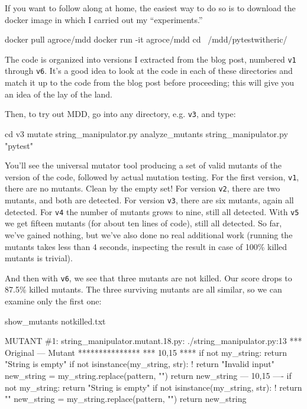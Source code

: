 \documentclass[sigplan,screen]{acmart}
\begin{document}
    If you want to follow along at home, the easiest way to do so is
    to download the docker image in which I carried out my
    ``experiments.''

 \begin{code}
 docker pull agroce/mdd
 docker run -it agroce/mdd
 cd ~/mdd/pytestwitheric/
 \end{code}

The code is organized into versions I extracted from the blog
post, numbered {\tt v1} through {\tt v6}.  It's a good idea to look at
the code in each of these directories and match it up to the code from
the blog post before proceeding; this will give you an idea of the
lay of the land.
 
    Then, to try out MDD, go into any directory, e.g. {\tt v3}, and type:

 \begin{code}
 cd v3
 mutate string\_manipulator.py
 analyze\_mutants string\_manipulator.py "pytest"
\end{code}

You'll see the universal mutator tool producing a set of valid mutants
of the version of the code, followed by actual mutation testing.  For
the first version, {\tt v1}, there are no mutants.  Clean by the
empty set!  For version {\tt v2}, there are two mutants, and both are
detected.  For version {\tt v3}, there are six mutants, again all
detected. For {\tt v4} the number of mutants grows to nine, still all
detected.  With {\tt v5} we get fifteen mutants (for about ten lines
of code), still all detected.  So far, we've gained nothing, but we've
also done no real additional work (running the mutants takes less than 4
seconds, inspecting the result in case of 100\% killed mutants is trivial).

And then with {\tt v6}, we see that three mutants are not killed. Our
score drops to 87.5\% killed mutants.  The three surviving mutants are
all similar, so we can examine only the first one:

{\scriptsize
\begin{code}
show\_mutants notkilled.txt 

MUTANT \#1:
string\_manipulator.mutant.18.py: ./string\_manipulator.py:13
*** Original
--- Mutant
***************
*** 10,15 ****
          if not my\_string:  
              return "String is empty"  
          if not isinstance(my\_string, str):  
!             return "Invalid input"  
          new\_string = my\_string.replace(pattern, "")  
          return new\_string
--- 10,15 ----
          if not my\_string:  
              return "String is empty"  
          if not isinstance(my\_string, str):  
!             return ""  
          new\_string = my\_string.replace(pattern, "")  
          return new\_string
        \end{code}
      }
\end{document}
